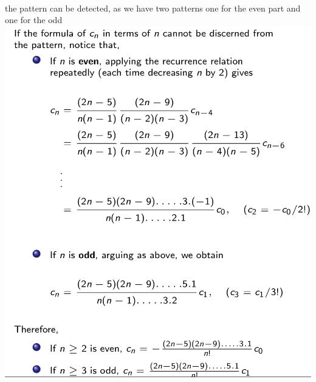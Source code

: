 \documentclass[11pt]{article}
\theoremstyle{definition}
\begin{document}
\\
the pattern can be detected, as we have two patterns one for the even part and one for the odd
\includegraphics[scale=0.5]{images/img3.png}
\end{document}
